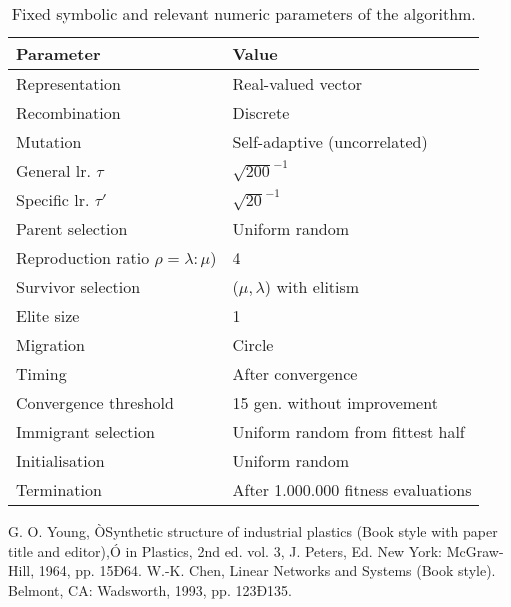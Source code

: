 \documentclass[letterpaper, 10 pt, conference]{ieeeconf}  %
\begin{document}
\begin{table}
\caption{Fixed symbolic and relevant numeric parameters of the algorithm.}
\centering
\begin{tabular}{>{\quad}ll}
\toprule
\textbf{Parameter} & \textbf{Value} \\
\midrule
Representation      & Real-valued vector \\
\midrule
Recombination       & Discrete \\
\midrule
Mutation            & Self-adaptive (uncorrelated) \\
\quad General lr. $\tau$ & $\sqrt{200}^{-1}$ \\
\quad Specific lr. $\tau'$ & $\sqrt{20}^{-1}$ \\
\midrule
Parent selection    & Uniform random \\
\quad Reproduction ratio $\rho=\lambda:\mu$) & 4 \\
\midrule
Survivor selection  & ($\mu,\lambda$) with elitism \\
\quad Elite size & 1 \\
\midrule
Migration           & Circle \\
\quad Timing        & After convergence \\
\quad Convergence threshold & 15 gen. without improvement \\
\quad Immigrant selection & Uniform random from fittest half \\
\midrule
Initialisation      & Uniform random \\
\midrule
Termination         & After 1.000.000 fitness evaluations \\
\bottomrule
\end{tabular}
\end{table}


\addtolength{\textheight}{-12cm}   %








\begin{thebibliography}{99}

 G. O. Young, ÒSynthetic structure of industrial plastics (Book style with paper title and editor),Ó 	in Plastics, 2nd ed. vol. 3, J. Peters, Ed.  New York: McGraw-Hill, 1964, pp. 15Ð64.
 W.-K. Chen, Linear Networks and Systems (Book style).	Belmont, CA: Wadsworth, 1993, pp. 123Ð135.
\end{thebibliography}
\end{document}
